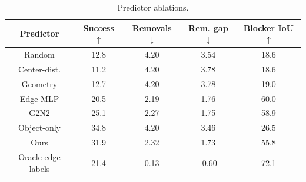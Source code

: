 \begin{table}[htbp]
  \centering
  \caption{Predictor ablations.}
  \label{tab:stage3_predictor_comparison}
  \small
  \setlength{\tabcolsep}{4.5pt}
  \begin{tabular}{ccccc}
    \toprule
    Predictor & Success $\uparrow$ & Removals $\downarrow$ & Rem. gap $\downarrow$ & Blocker IoU $\uparrow$ \\
    \midrule
    Random & 12.8 & 4.20 & 3.54 & 18.6 \\
    Center-dist. & 11.2 & 4.20 & 3.78 & 18.6 \\
    Geometry & 12.7 & 4.20 & 3.78 & 19.0 \\
    Edge-MLP & 20.5 & 2.19 & 1.76 & 60.0 \\
    G2N2 & 25.1 & 2.27 & 1.75 & 58.9 \\
    Object-only & 34.8 & 4.20 & 3.46 & 26.5 \\
    Ours & 31.9 & 2.32 & 1.73 & 55.8 \\
    Oracle edge labels & 21.4 & 0.13 & -0.60 & 72.1 \\
    \bottomrule
  \end{tabular}
\end{table}
